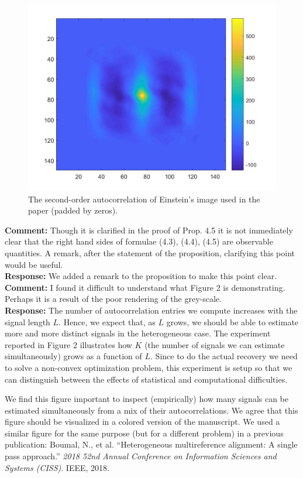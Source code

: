 \documentclass[12pt]{article}
\newcommand{\1}{\mathbf{1}}
\theoremstyle{plain}
\theoremstyle{definition}
\theoremstyle{remark}
\theoremstyle{plain}
\theoremstyle{remark}
\theoremstyle{plain}
\theoremstyle{plain}
\theoremstyle{plain}
\numberwithin{equation}{section}
\begin{document}
\begin{figure}[h]
	\centering
	\includegraphics[scale=0.3]{Xcorr}
	\caption{	\label{fig:XC} The second-order autocorrelation of Einstein's image used in the paper (padded by zeros).}
\end{figure}

\noindent \textbf{Comment:} Though it is clarified in the proof of Prop. 4.5 it is not immediately clear that  the right hand sides of formulae (4.3), (4.4), (4.5) are observable quantities. A remark, after the statement of the proposition, clarifying this  point would be useful.\\

\noindent \textbf{Response:} We added a remark to the proposition to make this point clear.\\

\noindent \textbf{Comment:}  I found it difficult to understand what Figure 2 is demonstrating. Perhaps it is a result of the poor rendering of the grey-scale.
\\ 

\noindent \textbf{Response:} The number of autocorrelation entries we compute increases with the signal length $L$. Hence, we expect that, as $L$ grows, we should be able to estimate more and more distinct signals in the heterogeneous case. The experiment reported in Figure 2 illustrates how $K$ (the number of signals we can estimate simultaneously) grows as a function of $L$. Since to do the actual recovery we need to solve a non-convex optimization problem, this experiment is setup so that we can distinguish between the effects of statistical and computational difficulties.

We find this figure important to inspect (empirically) how many signals can be estimated simultaneously from a mix of their autocorrelations. We agree that this figure should be visualized in a colored version of the manuscript. We used a similar figure for the same purpose (but for a different problem) in a previous publication: Boumal, N., et al. ``Heterogeneous multireference alignment: A single pass approach.'' \emph{2018 52nd Annual Conference on Information Sciences and Systems (CISS)}. IEEE, 2018.
\end{document}
